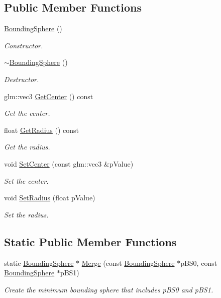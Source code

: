 \subsection*{Public Member Functions}
\begin{DoxyCompactItemize}
\item 
\hyperlink{class_bounding_sphere_a3cc5fe6a8e361c2330331713f69336c0}{Bounding\+Sphere} ()
\begin{DoxyCompactList}\small\item\em Constructor. \end{DoxyCompactList}\item 
\hyperlink{class_bounding_sphere_a0d6744fa169e5d5b884013da1237098c}{$\sim$\+Bounding\+Sphere} ()
\begin{DoxyCompactList}\small\item\em Destructor. \end{DoxyCompactList}\item 
glm\+::vec3 \hyperlink{class_bounding_sphere_ae909e2e9e5c63654953b2a89ba7cd50b}{Get\+Center} () const 
\begin{DoxyCompactList}\small\item\em Get the center. \end{DoxyCompactList}\item 
float \hyperlink{class_bounding_sphere_a40d9116ac275d1528b9477620a17d0d0}{Get\+Radius} () const 
\begin{DoxyCompactList}\small\item\em Get the radius. \end{DoxyCompactList}\item 
void \hyperlink{class_bounding_sphere_a9b7220ef9a607a5c45b2f64d4694290e}{Set\+Center} (const glm\+::vec3 \&p\+Value)
\begin{DoxyCompactList}\small\item\em Set the center. \end{DoxyCompactList}\item 
void \hyperlink{class_bounding_sphere_a6cbd5fce30ae785ae4199715ff65c3d3}{Set\+Radius} (float p\+Value)
\begin{DoxyCompactList}\small\item\em Set the radius. \end{DoxyCompactList}\end{DoxyCompactItemize}
\subsection*{Static Public Member Functions}
\begin{DoxyCompactItemize}
\item 
static \hyperlink{class_bounding_sphere}{Bounding\+Sphere} $\ast$ \hyperlink{class_bounding_sphere_a73c9f3282481a5717fb8a401bb0fd133}{Merge} (const \hyperlink{class_bounding_sphere}{Bounding\+Sphere} $\ast$p\+B\+S0, const \hyperlink{class_bounding_sphere}{Bounding\+Sphere} $\ast$p\+B\+S1)
\begin{DoxyCompactList}\small\item\em Create the minimum bounding sphere that includes p\+B\+S0 and p\+B\+S1. \end{DoxyCompactList}\end{DoxyCompactItemize}
